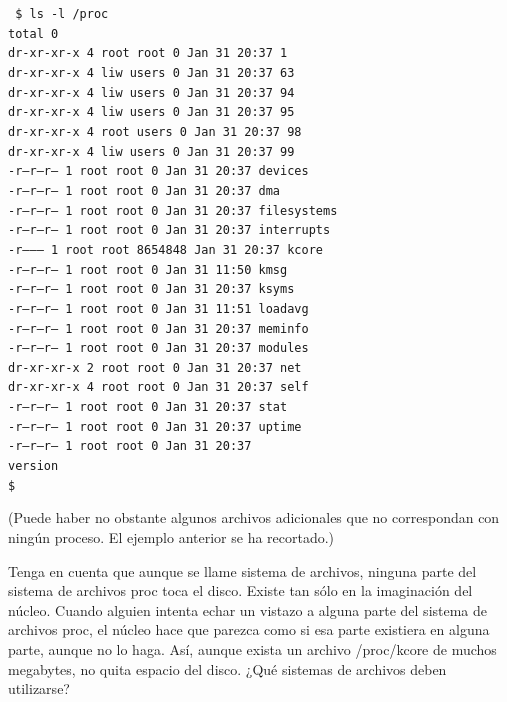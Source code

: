 \documentclass[12pt]{article}
\begin{document}
{\tt
\$ ls -l /proc\\
total 0\\
dr-xr-xr-x   4 root     root            0 Jan 31 20:37 1\\
dr-xr-xr-x   4 liw      users           0 Jan 31 20:37 63\\
dr-xr-xr-x   4 liw      users           0 Jan 31 20:37 94\\
dr-xr-xr-x   4 liw      users           0 Jan 31 20:37 95\\
dr-xr-xr-x   4 root     users           0 Jan 31 20:37 98\\
dr-xr-xr-x   4 liw      users           0 Jan 31 20:37 99\\
-r--r--r--   1 root     root            0 Jan 31 20:37 devices\\
-r--r--r--   1 root     root            0 Jan 31 20:37 dma\\
-r--r--r--   1 root     root            0 Jan 31 20:37 filesystems\\
-r--r--r--   1 root     root            0 Jan 31 20:37 interrupts\\
-r--------   1 root     root      8654848 Jan 31 20:37 kcore\\
-r--r--r--   1 root     root            0 Jan 31 11:50 kmsg\\
-r--r--r--   1 root     root            0 Jan 31 20:37 ksyms\\
-r--r--r--   1 root     root            0 Jan 31 11:51 loadavg\\
-r--r--r--   1 root     root            0 Jan 31 20:37 meminfo\\
-r--r--r--   1 root     root            0 Jan 31 20:37 modules\\
dr-xr-xr-x   2 root     root            0 Jan 31 20:37 net\\
dr-xr-xr-x   4 root     root            0 Jan 31 20:37 self\\
-r--r--r--   1 root     root            0 Jan 31 20:37 stat\\
-r--r--r--   1 root     root            0 Jan 31 20:37 uptime\\
-r--r--r--   1 root     root            0 Jan 31 20:37 \\
version\\
\$\\
}

(Puede haber no obstante algunos archivos adicionales que no correspondan con ningún proceso. El ejemplo anterior se ha recortado.)

Tenga en cuenta que aunque se llame sistema de archivos, ninguna parte del sistema de archivos proc toca el disco. Existe tan sólo en la imaginación del núcleo. Cuando alguien intenta echar un vistazo a alguna parte del sistema de archivos proc, el núcleo hace que parezca como si esa parte existiera en alguna parte, aunque no lo haga. Así, aunque exista un archivo /proc/kcore de muchos megabytes, no quita espacio del disco.
¿Qué sistemas de archivos deben utilizarse?
\end{document}
